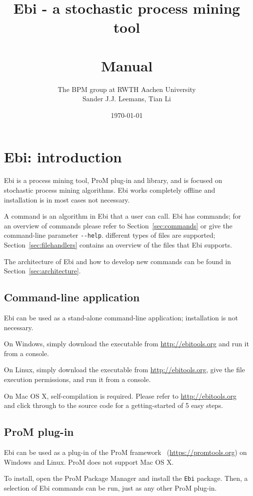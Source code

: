 \documentclass{article}
\title{Ebi - a stochastic process mining tool\\{\small\version}\\Manual}
\author{The BPM group at RWTH Aachen University\\
Sander J.J. Leemans, Tian Li}
\date{\today}
\begin{document}
\maketitle

\tableofcontents

\clearpage
\section{Ebi: introduction}
	Ebi is a process mining tool, ProM plug-in and library, and is focused on stochastic process mining algorithms.
	Ebi works completely offline and installation is in most cases not necessary.
		
	A command is an algorithm in Ebi that a user can call.
	Ebi has \numberofcommands{} commands; for an overview of commands please refer to Section~\ref{sec:commands} or give the command-line parameter \verb=--help=.
	\numberoffilehandlers{} different types of files are supported; Section~\ref{sec:filehandlers} contains an overview of the files that Ebi supports.
	
	The architecture of Ebi and how to develop new commands can be found in Section~\ref{sec:architecture}.
	
	\subsection{Command-line application}
		Ebi can be used as a stand-alone command-line application; installation is not necessary.
		
		On Windows, simply download the executable from \url{http://ebitools.org} and run it from a console.
		
		On Linux, simply download the executable from \url{http://ebitools.org}, give the file execution permissions, and run it from a console.
		
		On Mac OS X, self-compilation is required. 
		Please refer to \url{http://ebitools.org} and click through to the source code for a getting-started of 5 easy steps.
		
	\subsection{ProM plug-in}
		Ebi can be used as a plug-in of the ProM framework~\cite{DBLP:conf/bpm/VerbeekBDA10} (\url{https://promtools.org}) on Windows and Linux. 
		ProM does not support Mac OS X.
		
		To install, open the ProM Package Manager and install the \verb=Ebi= package.
		Then, a selection of Ebi commands can be run, just as any other ProM plug-in.
		
\end{document}
